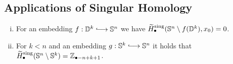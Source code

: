 	\newpage
	\subsection{Applications of Singular Homology}

	\begin{proposition}
		\vspace{-1.75em}
		\begin{enumerate}[(i)]
			\item{
				For an embedding $f:\D^k \longrightincl \S^n$ we have $\widetilde{H}_\bullet^\text{sing}(\mathbb{S}^n \setminus f(\mathbb{D}^k),x_0) = 0$.
			}
			\item{
				For $k<n$ and an embedding $g: \S^k \longrightincl \S^n$ it holds that $\widetilde{H}_\bullet^\text{sing}(\mathbb{S}^n \setminus \mathbb{S}^k) = \mathbb{Z}_{\bullet-n+k+1}$.
			}
		\end{enumerate}
	\end{proposition}
